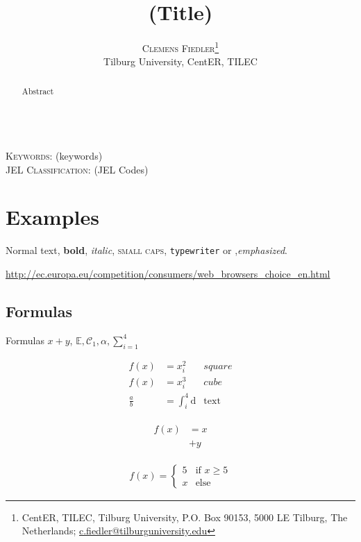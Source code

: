 \documentclass[a4paper, 11pt]{article}
\author{\textsc{Clemens Fiedler}\thanks{CentER, TILEC, Tilburg University, P.O. Box 90153, 5000 LE Tilburg, The Netherlands; \href{mailto:c.fiedler@tilburguniversity.edu}{c.fiedler@tilburguniversity.edu}}\\
	Tilburg University, CentER, TILEC}
\title{(Title)}
\renewcommand{\d}{\text{d}} %
\newcommand{\note}[1]{\marginpar{\footnotesize #1} }
\begin{document}
	
\maketitle

\begin{abstract}
	Abstract
\end{abstract}

\hspace{4cm}\\
\noindent\textsc{Keywords:} (keywords)\\
\noindent\textsc{JEL Classification:} (JEL Codes)

\newpage
\tableofcontents

\newpage
\listoffigures

\newpage
\section{Examples}\label{sec:examples}

Normal text, \textbf{bold}, \textit{italic}, \textsc{small caps}, \texttt{typewriter} or ,\emph{emphasized}. \note{side note}

\url{http://ec.europa.eu/competition/consumers/web_browsers_choice_en.html}

\subsection{Formulas}
Formulas $x+y$, $\mathbb{E}, \mathcal{C}_1, \alpha, \sum_{i=1}^{4}$

\begin{align}
f(x)&=x_i^2 &square\\
f(x)&=x_i^3 &cube\\
\frac{a}{b}&=\int_{i}^{4} \d &\text{text}\nonumber
\end{align}

\begin{align}
	\begin{split}
	f(x)&=x\\
	&+y
	\end{split}
\end{align}

\begin{align}
	f(x)=
	\begin{cases}
	5& \text{if } x \geq 5\\
	x& \text{else}
	\end{cases}
\end{align}
\end{document}
